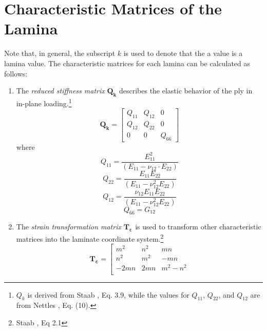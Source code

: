 \documentclass{article}
\begin{document}
\section{Characteristic Matrices of the Lamina}
\label{sec:lamina_matrices}
Note that, in general, the subscript $k$ is used to denote that the a value is a lamina value. The characteristic matrices for each lamina can be calculated as follows:

  \begin{enumerate}
    \item The \emph{reduced stiffness matrix} $\bm{Q_{k}}$ describes the elastic behavior of the ply in in-plane loading.\footnote{$Q_{k}$ is derived from Staab \cite{staab}, Eq. 3.9, while the values for $Q_{11}$, $Q_{22}$, and $Q_{12}$ are from Nettles \cite{nasa}, Eq. (10).}
      \begin{equation}
        \label{var:Qk} %
        \bm{Q_{k}} = \left[
                        \begin{array}{ccc}
                          Q_{11} & Q_{12} & 0 \\
                          Q_{12} & Q_{22} & 0 \\
                          0  &      0     & Q_{66}
                        \end{array}
                      \right]
      \end{equation}
      where
      $$
        Q_{11} = \frac{E_{11}^{2}}{\left(E_{11} - \nu_{12} \cdot E_{22}\right)}
      $$ \vspace{1mm}
      $$
        Q_{22} = \frac{E_{11} E_{22}}{\left(E_{11} - \nu_{12}^2 E_{22}\right)}
      $$ \vspace{1mm}
      $$
      Q_{12} = \frac{\nu_{12} E_{11} E_{22}}{\left(E_{11} - \nu_{12}^2 E_{22}\right)}
      $$ \vspace{1mm}
      $$
        Q_{66} = G_{12}
      $$
    \item The \emph{strain transformation matrix} $\bm{T_{\varepsilon}}$ is used to transform other characteristic matrices into the laminate coordinate system.\footnote{Staab \cite{staab}, Eq 2.1}
    \begin{equation}
      \label{var:Tepsilon} %
      \bm{T_{\varepsilon}} = \left[ \begin{array}{ccc}
                                      m^{2} & n^{2} & mn \\
                                      n^{2} & m^{2} & -mn \\
                                      -2mn & 2mn & m^{2} - n^{2} \\

\end{array}
\end{equation}
\end{enumerate}
\end{document}
